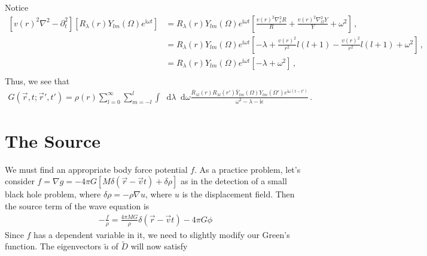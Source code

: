 \documentclass{article}
\newcommand*\diff{\mathop{}\!\mathrm{d}}
\newcommand*\te[1]{\text{#1}}
\newcommand*\ps[1]{\left[#1\right]}
\newcommand*\f[2]{\frac{#1}{#2}}
\newcommand*\I{\te{i}}
\begin{document}
Notice
\begin{align}
\ps{v(r)^2\nabla^2-\partial_t^2}\ps{R_\lambda(r)Y_{lm}(\Omega)e^{\I\omega t}}&=R_\lambda(r)Y_{lm}(\Omega)e^{\I\omega t}\ps{\f{v(r)^2\nabla_r^2R}{R}+\f{v(r)^2\nabla_\Omega^2Y}{Y}+\omega^2}\,,\\
&=R_\lambda(r)Y_{lm}(\Omega)e^{\I\omega t}\ps{-\lambda+\f{v(r)^2}{r^2}l(l+1)-\f{v(r)^2}{r^2}l(l+1)+\omega^2}\,,\\
&=R_\lambda(r)Y_{lm}(\Omega)e^{\I\omega t}\ps{-\lambda+\omega^2}\,,\\
\end{align}
Thus, we see that
\begin{align}
G(\vec r,t;\vec r',t')=\rho(r)\sum_{l=0}^\infty\sum_{m=-l}^l\int\diff\lambda\diff\omega\f{\bar R_{\lambda l}(r)R_{\lambda l}(r')\bar Y_{lm}(\Omega)Y_{lm}(\Omega') e^{\I\omega(t-t')}}{\omega^2-\lambda-\I\epsilon}\,.
\end{align}





\section{The Source}
We must find an appropriate body force potential $f$. As a practice problem, let's consider $f=\nabla g=-4\pi G\ps{M\delta(\vec r-\vec vt)+\delta\rho}$ as in the detection of a small black hole problem, where $\delta\rho=-\rho\nabla u$, where $u$ is the displacement field. Then the source term of the wave equation is
\begin{align}
-\f f\rho=\f{4\pi M G}{\rho}\delta(\vec r-\vec vt)-4\pi G\phi
\end{align}
Since $f$ has a dependent variable in it, we need to slightly modify our Green's function. The eigenvectors $\tilde u$ of $\tilde D$ will now satisfy
\end{document}
